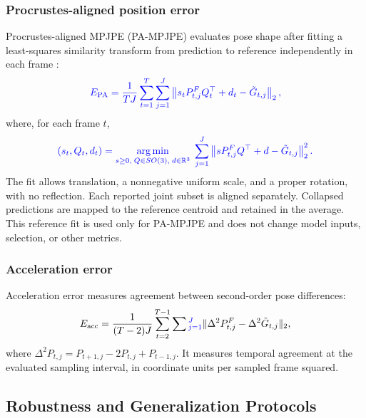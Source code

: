 \documentclass[preprint,12pt]{elsarticle}
\providecommand{\DIFaddbegin}{} %
\providecommand{\DIFaddend}{} %
\providecommand{\DIFadd}[1]{{\protect\color{blue}#1}} %
\begin{document}
\subsubsection{Procrustes-aligned position error}
Procrustes-aligned MPJPE (PA-MPJPE) evaluates pose shape after fitting a least-squares similarity transform from prediction to reference independently in each frame \DIFaddbegin \DIFadd{:
}\[
\DIFadd{E_{\mathrm{PA}}=\frac{1}{TJ}\sum_{t=1}^{T}\sum_{j=1}^{J}\left\|s_t P^F_{t,j}Q_t^{\top}+d_t-\tilde{G}_{t,j}\right\|_2,
}\]
\DIFadd{where, for each frame \(t\),
}\[
\DIFadd{(s_t,Q_t,d_t)=\underset{s\geq0,\;Q\in SO(3),\;d\in\mathbb{R}^3}{\arg\min}\;\sum_{j=1}^{J}\left\|sP^F_{t,j}Q^{\top}+d-\tilde{G}_{t,j}\right\|_2^2 .
}\]
\DIFaddend The fit allows translation, a nonnegative uniform scale, and a proper rotation, with no reflection. Each reported joint subset is aligned separately. Collapsed predictions are mapped to the reference centroid and retained in the average. This reference fit is used only for PA-MPJPE and does not change model inputs, selection, or other metrics.

\subsubsection{Acceleration error}
Acceleration error measures agreement between second-order pose differences:
\[
E_{\mathrm{acc}}=\frac{1}{(T-2)J}\sum_{t=2}^{T-1}\sum \DIFaddbegin \DIFadd{_{j=1}^{J}
}\DIFaddend \|\Delta^2 P^F_{t,j}-\Delta^2\tilde{G}_{t,j}\|_2,
\]
where \(\Delta^2 P_{t,j}=P_{t+1,j}-2P_{t,j}+P_{t-1,j}\). It measures temporal agreement at the evaluated sampling interval, in coordinate units per sampled frame squared.

\subsection{ \DIFaddbegin \DIFadd{Robustness and Generalization Protocols}\DIFaddend }
\label{subsec:controlled_protocol}
\end{document}
